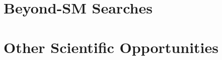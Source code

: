 
\section{Beyond-SM Searches}
\label{sec:landscape-bsm}


\section{Other Scientific Opportunities }
\label{sec:landscape-othertop}


